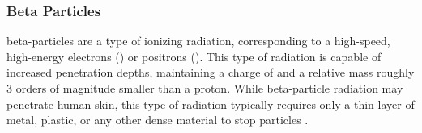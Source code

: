 \documentclass[../../../../main.tex]{subfiles}
\begin{document}
%
    \subsubsection{Beta Particles}%
    \label{sec:chapter-2:radiation-detection:types-of-radiation:beta-particles}%
    \Glspl{beta-particle} are a type of ionizing radiation, corresponding to a high-speed, high-energy electrons () or positrons ().
    This type of radiation is capable of increased penetration depths, maintaining a charge of  and a relative mass roughly \num{3} orders of magnitude smaller than a proton.
    While \gls{beta-particle} radiation may penetrate human skin, this type of radiation typically requires only a thin layer of metal, plastic, or any other dense material to stop particles \cite{book:Knoll_2010}.
\end{document}
